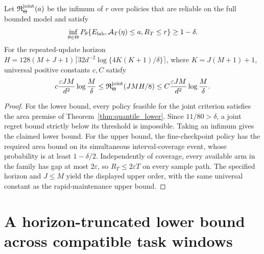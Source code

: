 \begin{corollary}
\label{cor:joint_quantile}
Let $\mathfrak R^{\rm joint}_\Theta(a)$ be the infimum of $r$ over policies
that are reliable on the full bounded model and satisfy
\[
 \inf_{\theta\in\Theta}
 P_\theta\{E_{\rm lab},\mathcal A_T(\eta)\le a,R_T\le r\}\ge1-\delta.
\]
For the repeated-update horizon
$H=128(M+J+1)\lceil32d^{-2}\log\{4K(K+1)/\delta\}\rceil$,
where $K=J(M+1)+1$, universal positive constants $c,C$ satisfy
\[
 c\frac{\varepsilon JM}{d^2}\log\frac M\delta
 \le\mathfrak R^{\rm joint}_\Theta(JMH/8)
 \le C\frac{\varepsilon JM}{d^2}\log\frac M\delta.
\]
\end{corollary}
\begin{proof}
For the lower bound, every policy feasible for the joint criterion satisfies
the area premise of Theorem~\ref{thm:quantile_lower}. Since
$11/80>\delta$, a joint regret bound strictly below its threshold is
impossible. Taking an infimum gives the claimed lower bound.
For the upper bound, the fine-checkpoint policy has the required area bound
on its simultaneous interval-coverage event, whose probability is at least
$1-\delta/2$. Independently of coverage, every available arm in the family has
gap at most $2\varepsilon$, so $R_T\le2\varepsilon T$ on every sample path.
The specified horizon and $J\le M$ yield the displayed upper order, with the
same universal constant as the rapid-maintenance upper bound.
\end{proof}

\section{A horizon-truncated lower bound across compatible task windows}
\label{sec:truncated_extension}

